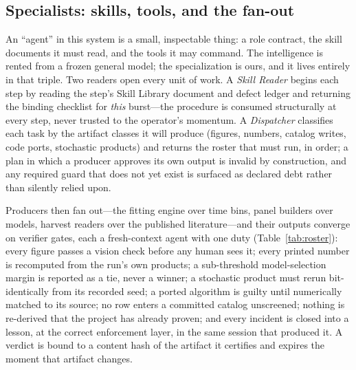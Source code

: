\documentclass[twocolumn]{aastex631}
\begin{document}
\subsection{Specialists: skills, tools, and the fan-out} \label{sec:roster}

An ``agent'' in this system is a small, inspectable thing: a role
contract, the skill documents it must read, and the tools it may command.
The intelligence is rented from a frozen general model; the specialization
is ours, and it lives entirely in that triple. Two readers open every unit
of work. A \emph{Skill Reader} begins each step by reading the step's
Skill Library document and defect ledger and returning the binding
checklist for \emph{this} burst---the procedure is consumed structurally
at every step, never trusted to the operator's momentum. A
\emph{Dispatcher} classifies each task by the artifact classes it will
produce (figures, numbers, catalog writes, code ports, stochastic
products) and returns the roster that must run, in order; a plan in which
a producer approves its own output is invalid by construction, and any
required guard that does not yet exist is surfaced as declared debt
rather than silently relied upon.

Producers then fan out---the fitting engine over time bins, panel builders
over models, harvest readers over the published literature---and their
outputs converge on verifier gates, each a fresh-context agent with one
duty (Table~\ref{tab:roster}): every figure passes a vision check before
any human sees it; every printed number is recomputed from the run's own
products; a sub-threshold model-selection margin is reported as a tie,
never a winner; a stochastic product must rerun bit-identically from its
recorded seed; a ported algorithm is guilty until numerically matched to
its source; no row enters a committed catalog unscreened; nothing is
re-derived that the project has already proven; and every incident is
closed into a lesson, at the correct enforcement layer, in the same
session that produced it. A verdict is bound to a content hash of the
artifact it certifies and expires the moment that artifact changes.
\end{document}
